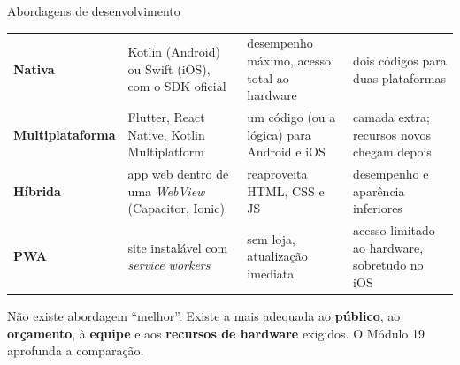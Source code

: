 \documentclass[aspectratio=169,10pt]{beamer}
\begin{document}
\begin{frame}{Abordagens de desenvolvimento}
  \footnotesize
  \begin{tabularx}{\textwidth}{@{}l L L L@{}}
    \toprule
     &  &  &  \\
    \midrule
    \textbf{Nativa} & Kotlin (Android) ou Swift (iOS), com o SDK oficial & desempenho máximo, acesso total ao hardware & dois códigos para duas plataformas \\
    \textbf{Multiplataforma} & Flutter, React Native, Kotlin Multiplatform & um código (ou a lógica) para Android e iOS & camada extra; recursos novos chegam depois \\
    \textbf{Híbrida} & app web dentro de uma \emph{WebView} (Capacitor, Ionic) & reaproveita HTML, CSS e JS & desempenho e aparência inferiores \\
    \textbf{PWA} & site instalável com \emph{service workers} & sem loja, atualização imediata & acesso limitado ao hardware, sobretudo no iOS \\
    \bottomrule
  \end{tabularx}
  \vspace{4pt}
  \begin{dica}
    Não existe abordagem ``melhor''. Existe a mais adequada ao \textbf{público}, ao \textbf{orçamento}, à \textbf{equipe} e aos \textbf{recursos de hardware} exigidos. O Módulo 19 aprofunda a comparação.
  \end{dica}
\end{frame}
\end{document}
